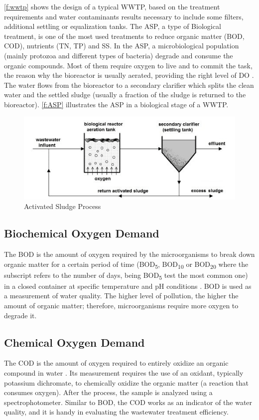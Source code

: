 \autoref{f:wwtp} shows the design of a typical \ac{WWTP}, based on the treatment requirements and water contaminants results necessary to include some filters, additional settling or equalization tanks.
The \ac{ASP}, a type of Biological treatment, is one of the most used treatments to reduce organic matter (\ac{BOD}, \ac{COD}), nutrients (\ac{TN}, \ac{TP}) and \ac{SS}. In the \ac{ASP}, a microbiological population (mainly protozoa and different types of bacteria) degrade and consume the organic compounds. Most of them require oxygen to live and to commit the task, the reason why the bioreactor is usually aerated, providing the right level of \ac{DO} \cite{Haimi2013}. The water flows from the bioreactor to a secondary clarifier which splits the clean water and the settled sludge (usually a fraction of the sludge is returned to the bioreactor). \autoref{f:ASP} illustrates the \ac{ASP} in a biological stage of a \ac{WWTP}.

\begin{figure}[h]
\centering
\includegraphics[width=14cm]{figures/Ch2/ASP.png}
\caption{Activated Sludge Process \cite{Fracz2016}}
\label{f:ASP}
\end{figure}

\subsection{Biochemical Oxygen Demand}
The \ac{BOD} is the amount of oxygen required by the microorganisms to break down organic matter for a certain period of time (BOD\textsubscript{5}, BOD\textsubscript{10} or BOD\textsubscript{20} where the subscript refers to the number of days, being BOD\textsubscript{5} test the most common one) in a closed container at specific temperature and pH conditions \cite{Wiesmann2007}. \ac{BOD} is used as a measurement of water quality. The higher level of pollution, the higher the amount of organic matter; therefore, microorganisms require more oxygen to degrade it.

\subsection{Chemical Oxygen Demand}
The \ac{COD} is the amount of oxygen required to entirely oxidize an organic compound in water \cite{Wiesmann2007}. Its measurement requires the use of an oxidant, typically potassium dichromate, to chemically oxidize the organic matter (a reaction that consumes oxygen). After the process, the sample is analyzed using a spectrophotometer. Similar to \ac{BOD}, the \ac{COD} works as an indicator of the water quality, and it is handy in evaluating the wastewater treatment efficiency.

